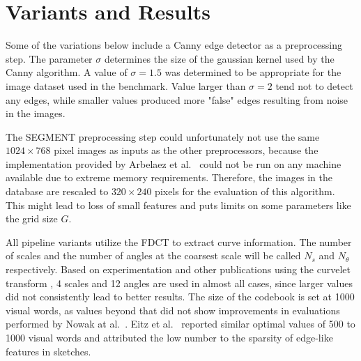 \section{Variants and Results}\label{sec:results}

Some of the variations below include a Canny edge detector as a preprocessing
step. The parameter $\sigma$ determines the size of the gaussian kernel used by
the Canny algorithm. A value of $\sigma = 1.5$ was determined to be appropriate
for the image dataset used in the benchmark. Value larger than $\sigma = 2$
tend not to detect any edges, while smaller values produced more "false" edges
resulting from noise in the images.

The SEGMENT preprocessing step could unfortunately not use the same $1024
\times 768$ pixel images as inputs as the other preprocessors, because the
implementation provided by Arbelaez et al.\ \autocite{arbelaez_contour_2011}
could not be run on any machine available due to extreme memory requirements.
Therefore, the images in the database are rescaled to $320 \times 240$ pixels
for the evaluation of this algorithm. This might lead to loss of small features
    and puts limits on some parameters like the grid size $G$.

All pipeline variants utilize the FDCT to extract curve information. The number
of scales and the number of angles at the coarsest scale will be called $N_s$
and $N_{\theta}$ respectively. Based on experimentation and other publications
using the curvelet transform \autocite{mandal_curvelet_2009}
\autocite{guha_curvelet_????}, 4 scales and 12 angles are used in almost all
cases, since larger values did not consistently lead to better results. The
size of the codebook is set at 1000 visual words, as values beyond that did
not show improvements in evaluations performed by Nowak at al.\
\autocite{nowak_sampling_2006}. Eitz et al.\ \autocite{eitz_sketch-based_2010}
reported similar optimal values of 500 to 1000 visual words and attributed the
low number to the sparsity of edge-like features in sketches.



